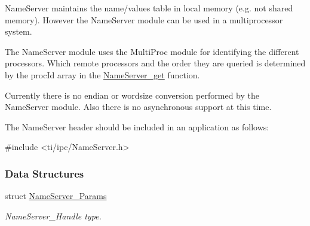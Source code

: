 Name\-Server maintains the name/values table in local memory (e.\-g. not shared memory). However the Name\-Server module can be used in a multiprocessor system.

The Name\-Server module uses the Multi\-Proc module for identifying the different processors. Which remote processors and the order they are queried is determined by the proc\-Id array in the \hyperlink{_name_server_8h_a5f1013e57e7c5da9f003063d70a76e01}{Name\-Server\-\_\-get} function.

Currently there is no endian or wordsize conversion performed by the Name\-Server module. Also there is no asynchronous support at this time.

The Name\-Server header should be included in an application as follows\-: 
\begin{DoxyCode}
\textcolor{preprocessor}{    #include <ti/ipc/NameServer.h>}
\end{DoxyCode}
 \subsubsection*{Data Structures}
\begin{DoxyCompactItemize}
\item 
struct \hyperlink{struct_name_server___params}{Name\-Server\-\_\-\-Params}
\begin{DoxyCompactList}\small\item\em Name\-Server\-\_\-\-Handle type. \end{DoxyCompactList}\end{DoxyCompactItemize}
